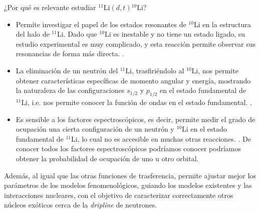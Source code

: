 ¿Por qué es relevante estudiar \({}^{11}\text{Li}(d,t){}^{10}\text{Li}\)?
\begin{itemize}
    \item Permite investigar el papel de los estados resonantes de \(^{10}\text{Li}\) en la estructura del halo de \(^{11}\text{Li}\). Dado que $^{10}\text{Li}$ es inestable y no tiene un estado ligado, su estudio experimental es muy complicado, y esta reacción permite observar sus resonancias de forma más directa. \cite{SANETULLAEV2016481}.
    
    \item La eliminación de un neutrón del \(^{11}\text{Li}\), trasfiriéndolo al \(^{10}\text{Li}\), nos permite obtener características específicas de momento angular y energía, mostrando la naturaleza de las configuraciones \(s_{1/2}\) y \(p_{1/2}\) en el estado fundamental de \({}^{11}\text{Li}\), i.e. nos permite conocer la función de ondas en el estado fundamental.  \cite{CASAL2017307}. 
    
    \item Es sensible a los factores espectroscópicos, es decir, permite medir el grado de ocupación una cierta configuración de un neutrón y \({}^{10}\text{Li}\) en el estado fundamental de \({}^{11}\text{Li}\), lo cual no es accesible en muchas otras reacciones. \cite{SANETULLAEV2016481}. De conocer todos los factores espectroscópicos podríamos conocer  podríamos obtener la probabilidad de ocupación de uno u otro orbital.
\end{itemize}
Además, al igual que las otras funciones de trasferencia, permite ajustar mejor los parámetros de los modelos fenomenológicos, guiando los modelos existentes y las interacciones nucleares, con el objetivo de caracterizar correctamente otros núcleos exóticos cerca de la \textit{dripline} de neutrones.


